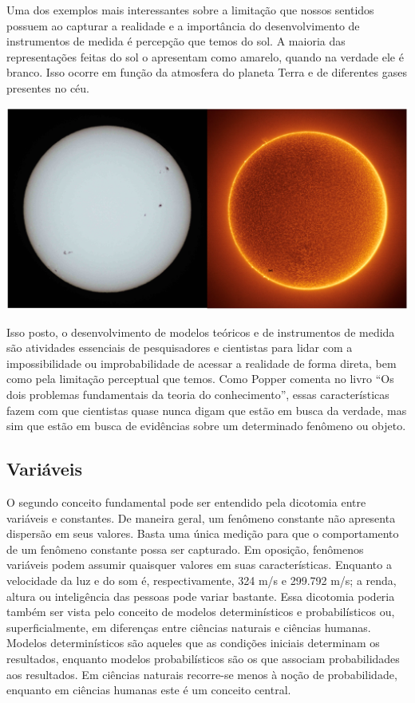 \documentclass[
]{book}
\begin{document}
Uma dos exemplos mais interessantes sobre a limitação que nossos
sentidos possuem ao capturar a realidade e a importância do
desenvolvimento de instrumentos de medida é percepção que temos do sol.
A maioria das representações feitas do sol o apresentam como amarelo,
quando na verdade ele é branco. Isso ocorre em função da atmosfera do
planeta Terra e de diferentes gases presentes no céu.

\includegraphics{./img/cap_sol.png}

Isso posto, o desenvolvimento de modelos teóricos e de instrumentos de
medida são atividades essenciais de pesquisadores e cientistas para
lidar com a impossibilidade ou improbabilidade de acessar a realidade de
forma direta, bem como pela limitação perceptual que temos. Como Popper
comenta no livro ``Os dois problemas fundamentais da teoria do
conhecimento'', essas características fazem com que cientistas quase
nunca digam que estão em busca da verdade, mas sim que estão em busca de
evidências sobre um determinado fenômeno ou objeto.

\hypertarget{variuxe1veis}{%
\subsection{Variáveis}\label{variuxe1veis}}

O segundo conceito fundamental pode ser entendido pela dicotomia entre
variáveis e constantes. De maneira geral, um fenômeno constante não
apresenta dispersão em seus valores. Basta uma única medição para que o
comportamento de um fenômeno constante possa ser capturado. Em oposição,
fenômenos variáveis podem assumir quaisquer valores em suas
características. Enquanto a velocidade da luz e do som é,
respectivamente, 324 m/s e 299.792 m/s; a renda, altura ou inteligência
das pessoas pode variar bastante. Essa dicotomia poderia também ser
vista pelo conceito de modelos determinísticos e probabilísticos ou,
superficialmente, em diferenças entre ciências naturais e ciências
humanas. Modelos determinísticos são aqueles que as condições iniciais
determinam os resultados, enquanto modelos probabilísticos são os que
associam probabilidades aos resultados. Em ciências naturais recorre-se
menos à noção de probabilidade, enquanto em ciências humanas este é um
conceito central.
\end{document}
